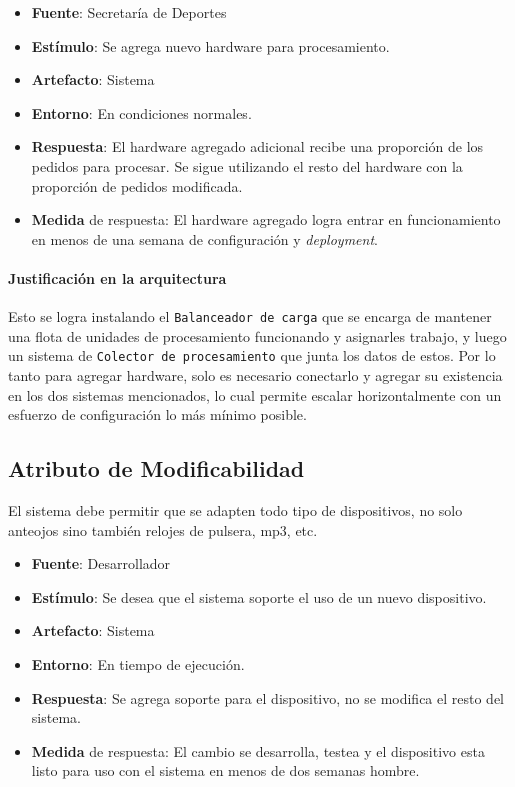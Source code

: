 \begin{itemize}
  \item \textbf{Fuente}: Secretaría de Deportes
  \item \textbf{Estímulo}: Se agrega nuevo hardware para procesamiento.
  \item \textbf{Artefacto}: Sistema
  \item \textbf{Entorno}: En condiciones normales.
  \item \textbf{Respuesta}: El hardware agregado adicional recibe una proporción de los pedidos para procesar. Se sigue utilizando el resto del hardware con la proporción de pedidos modificada.
  \item \textbf{Medida} de respuesta: El hardware agregado logra entrar en funcionamiento en menos de una semana de configuración y \emph{deployment}.
\end{itemize}

\paragraph{Justificación en la arquitectura}

Esto se logra instalando el \texttt{Balanceador de carga} que se encarga de mantener una flota de unidades de
procesamiento funcionando y asignarles trabajo, y luego un sistema de \texttt{Colector de procesamiento} que
junta los datos de estos. Por lo tanto para agregar hardware, solo es necesario conectarlo y agregar su 
existencia en los dos sistemas mencionados, lo cual permite escalar horizontalmente con un esfuerzo de 
configuración lo más mínimo posible.

\subsection{Atributo de Modificabilidad}
El sistema debe permitir que se adapten todo tipo de dispositivos, no solo anteojos sino también relojes de pulsera, mp3, etc.

\begin{itemize}
  \item \textbf{Fuente}: Desarrollador
  \item \textbf{Estímulo}: Se desea que el sistema soporte el uso de un nuevo dispositivo.
  \item \textbf{Artefacto}: Sistema
  \item \textbf{Entorno}: En tiempo de ejecución.
  \item \textbf{Respuesta}: Se agrega soporte para el dispositivo, no se modifica el resto del sistema.
  \item \textbf{Medida} de respuesta: El cambio se desarrolla, testea y el dispositivo esta listo para uso con el sistema en menos de dos semanas hombre.
\end{itemize}

